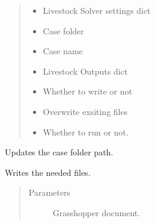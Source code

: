 \documentclass[letterpaper,10pt,english]{sphinxmanual}
\begin{document}
\begin{fulllineitems}
\begin{fulllineitems}
\begin{quote}
\begin{description}
\begin{itemize}
\item {} 
 \textendash{} Livestock Solver settings dict

\item {} 
 \textendash{} Case folder

\item {} 
 \textendash{} Case name

\item {} 
 \textendash{} Livestock Outputs dict

\item {} 
 \textendash{} Whether to write or not

\item {} 
 \textendash{} Overwrite exsiting files

\item {} 
 \textendash{} Whether to run or not.

\end{itemize}

\end{description}\end{quote}

\end{fulllineitems}


\begin{fulllineitems}
\label{\detokenize{cmf:livestock.components.comp_cmf.CMFSolve.update_case_path}}
Updates the case folder path.

\end{fulllineitems}


\begin{fulllineitems}
\label{\detokenize{cmf:livestock.components.comp_cmf.CMFSolve.write}}
Writes the needed files.
\begin{quote}\begin{description}
\item[{Parameters}] \leavevmode
{} \textendash{} Grasshopper document.

\end{description}\end{quote}

\end{fulllineitems}


\end{fulllineitems}
\end{document}
